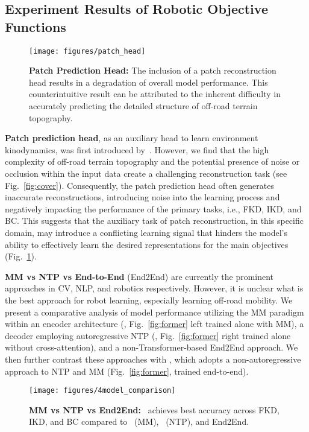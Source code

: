 \subsection{Experiment Results of Robotic Objective Functions} \label{sec:objective_perspective}
\begin{figure}[h]
  \centering
  \texttt{[image: figures/patch\_head]}
  \caption{\textbf{Patch Prediction Head:} The inclusion of a patch reconstruction head results in a degradation of overall model performance. This counterintuitive result can be attributed to the inherent difficulty in accurately predicting the detailed structure of off-road terrain topography.}
  \label{fig:patch_head}
\end{figure}

\textbf{Patch prediction head}, as an auxiliary head to learn environment kinodynamics, was first introduced by~\citet{nazeri2024vertiencoder}. However, we find that the high complexity of off-road terrain topography and the potential presence of noise or occlusion within the input data create a challenging reconstruction task (see Fig.~\ref{fig:cover}). Consequently, the patch prediction head often generates inaccurate reconstructions, introducing noise into the learning process and negatively impacting the performance of the primary tasks, i.e., FKD, IKD, and BC. This suggests that the auxiliary task of patch reconstruction, in this specific domain, may introduce a conflicting learning signal that hinders the model's ability to effectively learn the desired representations for the main objectives (Fig.~\ref{fig:patch_head}).


\textbf{MM vs NTP vs End-to-End} (End2End) are currently the prominent approaches in CV, NLP, and robotics respectively. However, it is unclear what is the best approach for robot learning, especially learning off-road mobility. We present a comparative analysis of model performance utilizing the MM paradigm within an encoder architecture (\coder, Fig.~\ref{fig:former} left trained alone with MM), a decoder employing autoregressive NTP (\vertidecoder, Fig.~\ref{fig:former} right trained alone without cross-attention), and a non-Transformer-based End2End approach. We then further contrast these approaches with \former,  which adopts a non-autoregressive approach to NTP and MM (Fig.~\ref{fig:former}, trained end-to-end). 

\begin{figure}[t]
  \centering
  \texttt{[image: figures/4model\_comparison]}
  \caption{\textbf{MM vs NTP  vs End2End:} \former~achieves best accuracy across FKD, IKD, and BC compared to \coder~(MM), \vertidecoder~(NTP), and End2End.}
  \label{fig:mm_vs_ntp}
\end{figure}

